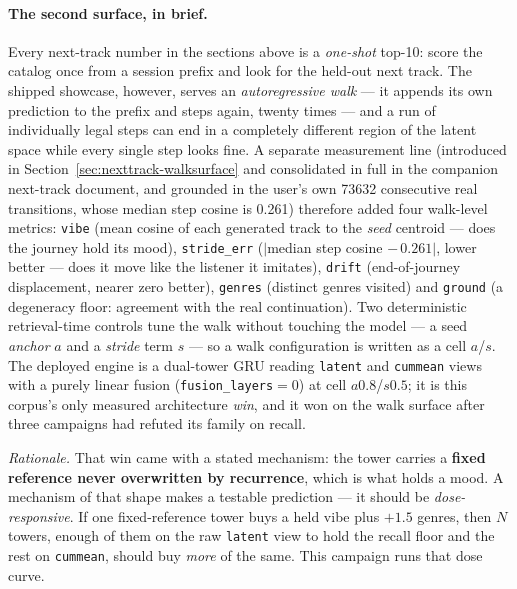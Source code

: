\documentclass[11pt]{article}
\begin{document}
\paragraph{The second surface, in brief.} Every next-track number in the
sections above is a \emph{one-shot} top-10: score the catalog once from a session
prefix and look for the held-out next track. The shipped showcase, however, serves
an \emph{autoregressive walk} --- it appends its own prediction to the prefix and
steps again, twenty times --- and a run of individually legal steps can end in a
completely different region of the latent space while every single step looks
fine. A separate measurement line (introduced in
Section~\ref{sec:nexttrack-walksurface} and consolidated in full in the companion
next-track document, and grounded in the user's own \num{73632} consecutive real
transitions, whose median step cosine is \num{0.261}) therefore added four
walk-level metrics: \texttt{vibe} (mean cosine of each generated track to the
\emph{seed} centroid --- does the journey hold its mood), \texttt{stride\_err}
($|$median step cosine $-\,\num{0.261}|$, lower better --- does it move like the
listener it imitates), \texttt{drift} (end-of-journey displacement, nearer zero
better), \texttt{genres} (distinct genres visited) and \texttt{ground} (a
degeneracy floor: agreement with the real continuation). Two deterministic
retrieval-time controls tune the walk without touching the model --- a seed
\emph{anchor} $a$ and a \emph{stride} term $s$ --- so a walk configuration is
written as a cell $a$/$s$. The deployed engine is a dual-tower GRU reading
\texttt{latent} and \texttt{cummean} views with a purely linear fusion
(\texttt{fusion\_layers}${}=0$) at cell $a\num{0.8}$/$s\num{0.5}$; it is this
corpus's only measured architecture \emph{win}, and it won on the walk surface
after three campaigns had refuted its family on recall.

\emph{Rationale.} That win came with a stated mechanism: the tower carries a
\textbf{fixed reference never overwritten by recurrence}, which is what holds a
mood. A mechanism of that shape makes a testable prediction --- it should be
\emph{dose-responsive}. If one fixed-reference tower buys a held vibe plus
$+\num{1.5}$ genres, then $N$ towers, enough of them on the raw \texttt{latent}
view to hold the recall floor and the rest on \texttt{cummean}, should buy
\emph{more} of the same. This campaign runs that dose curve.
\end{document}
